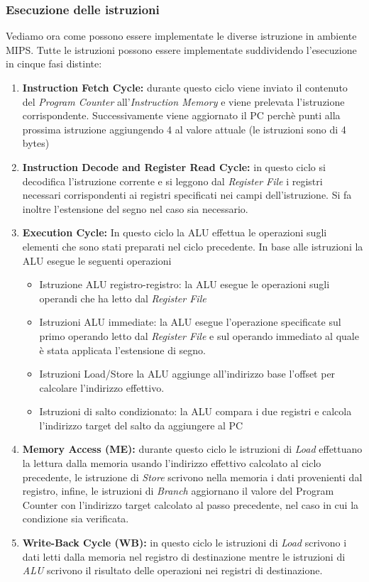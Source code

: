 \subsubsection{Esecuzione delle istruzioni}
Vediamo ora come possono essere implementate le diverse istruzione in ambiente MIPS. Tutte le istruzioni possono essere implementate suddividendo l'esecuzione in cinque fasi distinte:
\begin{enumerate}
\item \textbf{Instruction Fetch Cycle:} durante questo ciclo viene inviato il contenuto del \emph{Program Counter} all'\emph{Instruction Memory} e viene prelevata l'istruzione corrispondente. Successivamente viene aggiornato il PC perchè punti alla prossima istruzione aggiungendo 4 al valore attuale (le istruzioni sono di 4 bytes)
\item \textbf{Instruction Decode and Register Read Cycle:} in questo ciclo si decodifica l'istruzione corrente e si leggono dal \emph{Register File} i registri necessari corrispondenti ai registri specificati nei campi dell'istruzione. Si fa inoltre l'estensione del segno nel caso sia necessario.
\item \textbf{Execution Cycle:} In questo ciclo la ALU effettua le operazioni sugli elementi che sono stati preparati nel ciclo precedente. In base alle istruzioni la ALU esegue le seguenti operazioni
\begin{itemize}
\item Istruzione ALU registro-registro: la ALU esegue le operazioni sugli operandi che ha letto dal \emph{Register File}
\item Istruzioni ALU immediate: la ALU esegue l'operazione specificate sul primo operando letto dal \emph{Register File} e sul operando immediato al quale è stata applicata l'estensione di segno.
\item Istruzioni Load/Store la ALU aggiunge all'indirizzo base l'offset per calcolare l'indirizzo effettivo.
\item Istruzioni di salto condizionato: la ALU compara i due registri e calcola l'indirizzo target del salto da aggiungere al PC
\end{itemize}
\item \textbf{Memory Access (ME):} durante questo ciclo le istruzioni di \emph{Load} effettuano la lettura dalla memoria usando l'indirizzo effettivo calcolato al ciclo precedente, le istruzione di \emph{Store} scrivono nella memoria i dati provenienti dal registro, infine, le istruzioni di \emph{Branch}  aggiornano il valore del Program Counter con l'indirizzo target calcolato al passo precedente, nel caso in cui la condizione sia verificata.
\item \textbf{Write-Back Cycle (WB):} in questo ciclo le istruzioni di \emph{Load} scrivono i dati letti dalla memoria nel registro di destinazione mentre le istruzioni di \emph{ALU} scrivono il risultato delle operazioni nei registri di destinazione.
\end{enumerate}
